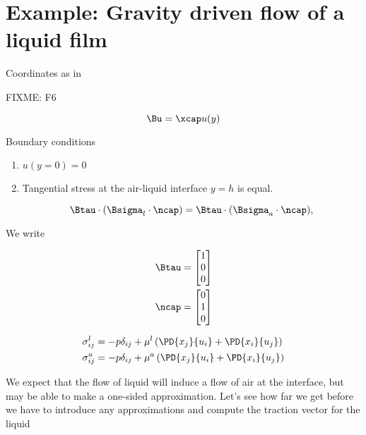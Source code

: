 \section{Example: Gravity driven flow of a liquid film}

Coordinates as in

FIXME: F6

\begin{equation}\label{eqn:continuumL12:150}
\Bu = \xcap u(y)
\end{equation}

Boundary conditions

\begin{enumerate}
\item $u(y = 0) = 0$
\item Tangential stress at the air-liquid interface $y = h$ is equal.

\begin{equation}\label{eqn:continuumL12:170}
\Btau \cdot (\Bsigma_l \cdot \ncap) = \Btau \cdot (\Bsigma_a \cdot \ncap),
\end{equation}
\end{enumerate}

We write 

\begin{align}\label{eqn:continuumL12:190}
\Btau &= 
\begin{bmatrix}
1 \\
0 \\
0
\end{bmatrix} \\
\ncap &= 
\begin{bmatrix}
0 \\
1 \\
0
\end{bmatrix} \\
\end{align}

\begin{align}\label{eqn:continuumL12:210}
\sigma_{ij}^l 
&= - p \delta_{ij} + \mu^l \left( 
\PD{x_j}{u_i} +
\PD{x_i}{u_j}
\right) \\
\sigma_{ij}^a 
&= - p \delta_{ij} + \mu^a \left( 
\PD{x_j}{u_i} +
\PD{x_i}{u_j}
\right) \\
\end{align}

We expect that the flow of liquid will induce a flow of air at the interface, but may be able to make a one-sided approximation.  Let's see how far we get before we have to introduce any approximations and compute the traction vector for the liquid

